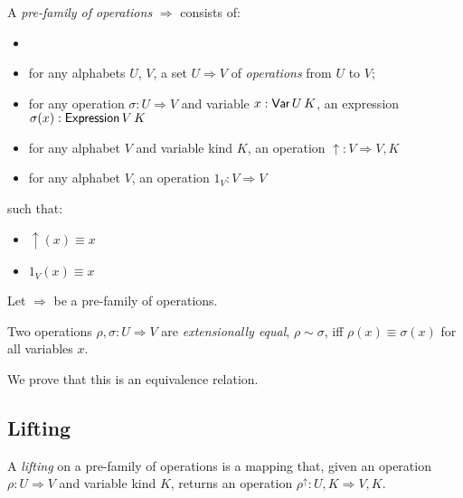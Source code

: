 \documentclass[envcountsame]{llncs}
\begin{document}
\begin{definition}
 A \emph{pre-family of operations} $\Rightarrow$ consists of:
 \begin{itemize}
  \item   \item for any alphabets $U$, $V$, a set $U \Rightarrow V$ of \emph{operations} from $U$ to $V$;
  \item for any operation $\sigma : U \Rightarrow V$ and variable $x : \AgdaDatatype{Var} \, U \, K$, an expression $\sigma(x) : \AgdaFunction{Expression} \,
  V \, K$ %
  \item for any alphabet $V$ and variable kind $K$, an operation $\uparrow : V \Rightarrow V , K$
  \item for any alphabet $V$, an operation $1_V : V \Rightarrow V$
 \end{itemize}
 such that:
 \begin{itemize}
  \item $\uparrow(x) \equiv x$
  \item $1_V(x) \equiv x$
 \end{itemize}
\end{definition}


Let $\Rightarrow$ be a pre-family of operations.

\begin{definition}
 Two operations $\rho, \sigma : U \Rightarrow V$ are \emph{extensionally equal}, $\rho \sim \sigma$, iff $\rho(x) \equiv \sigma(x)$ for all variables $x$.
\end{definition}

We prove that this is an equivalence relation.


\subsection{Lifting}

\begin{definition}[Lifting]
 A \emph{lifting} on a pre-family of operations is a mapping that, given an operation $\rho : U \Rightarrow V$ and variable kind $K$,
 returns an operation $\rho^\uparrow : U , K \Rightarrow V , K$.
\end{definition}
\end{document}
